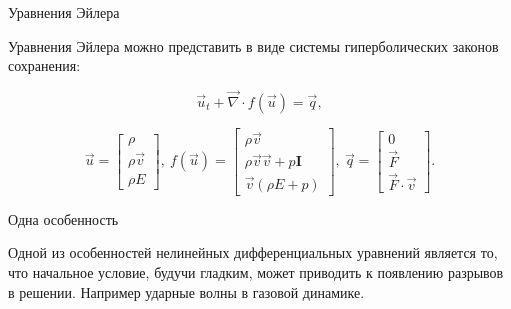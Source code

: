 \documentclass[10pt,xcolor=pst,aspectratio=169]{beamer}
\begin{document}
\begin{frame}{Уравнения Эйлера}

    \transdissolve[duration=0.1]
    \justifying
    \large

    Уравнения Эйлера можно представить в виде системы гиперболических законов сохранения:


    \[
        \vec{u}_{t} + \vec{\nabla} \cdot f \left( \vec{u} \right) = \vec{q},
    \]

    \[
        \vec{u}
        =
        \begin{bmatrix}
            \rho \\
            \rho \vec{v} \\
            \rho E
        \end{bmatrix}, \:
        f (\vec{u})
        =
        \begin{bmatrix}
            \rho \vec{v} \\
            \rho \vec{v} \vec{v} + p \textbf{I}\\
            \vec{v}
            \left(
                \rho E + p
            \right)
        \end{bmatrix}, \:
        \vec{q}
        =
        \begin{bmatrix}
            0 \\
            \vec{F} \\
            \vec{F} \cdot \vec{v}
        \end{bmatrix}.
    \]

\end{frame}

\begin{frame}{Одна особенность}

    \transdissolve[duration=0.1]
    \justifying
    \large

    Одной из особенностей нелинейных дифференциальных уравнений является то, что начальное условие, будучи гладким, может приводить к появлению разрывов в решении. Например ударные волны в газовой динамике.\\

\end{frame}
\end{document}

